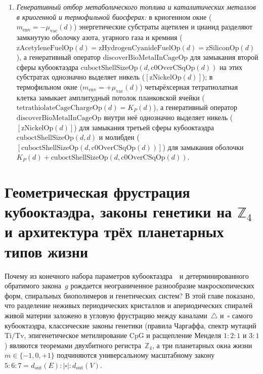 \begin{theorem}
\begin{enumerate}[label=\textbf{(\roman*)},leftmargin=*]
\begin{enumerate}[label=\textbf{(\alph*)},leftmargin=*,noitemsep]
  \item \emph{Генеративный отбор метаболического топлива и каталитических металлов в криогенной и термофильной биосферах:} в криогенном окне ($m_{\mathrm{env}}=-\mu_{\mathrm{vac}}(d)$) энергетические субстраты ацетилен и цианид разделяют замкнутую оболочку азота, угарного газа и кремния ($\mathrm{zAcetyleneFuelOp}(d) = \mathrm{zHydrogenCyanideFuelOp}(d) = \mathrm{zSiliconOp}(d)$), а генеративный оператор $\mathrm{discoverBioMetalInCageOp}$ для замыкания второй сферы кубооктаэдра $\mathrm{cuboctShellSizeOp}(d,\mathrm{c0OverCSqOp}(d))$ на этих субстратах однозначно выделяет никель ($[\mathrm{zNickelOp}(d)]$); в термофильном окне ($m_{\mathrm{env}}=+\mu_{\mathrm{vac}}(d)$) четырёхсерная тетратиолатная клетка замыкает амплитудный потолок планковской ячейки ($\mathrm{tetrathiolateCageChargeOp}(d) = K_P(d)$), а генеративный оператор $\mathrm{discoverBioMetalInCageOp}$ внутри неё однозначно выделяет никель ($[\mathrm{zNickelOp}(d)]$) для замыкания третьей сферы кубооктаэдра $\mathrm{cuboctShellSizeOp}(d,d)$ и молибден ($[\mathrm{cuboctShellSizeOp}(d,\mathrm{c0OverCSqOp}(d))]$) для замыкания оболочки $K_P(d) + \mathrm{cuboctShellSizeOp}(d,\mathrm{c0OverCSqOp}(d))$.
  \end{enumerate}
\end{enumerate}
\end{theorem}

\chapter{Геометрическая фрустрация кубооктаэдра, законы генетики на \texorpdfstring{$\mathbb{Z}_4$}{Z\_4} и архитектура трёх планетарных типов жизни}
\label{ch:bio-frustration-genetics-three-life-types}

Почему из конечного набора параметров кубооктаэдра~\latGCKshort\ и детерминированного обратимого закона~$g$ рождается неограниченное разнообразие макроскопических форм, спиральных биополимеров и генетических систем?
В этой главе показано, что разделение неживых периодических кристаллов и апериодических спиралей живой материи заложено в угловую фрустрацию между каналами~$\triangle$ и~$\square$ самого кубооктаэдра, классические законы генетики (правила Чаргаффа, спектр мутаций $\mathrm{Ti}/\mathrm{Tv}$, эпигенетическое метилирование $\mathrm{CpG}$ и расщепление Менделя $1:2:1$ и $3:1$) являются теоремами двухбитного регистра~$\mathbb{Z}_4$, а три планетарных окна жизни $m\in\{-1,0,+1\}$ подчиняются универсальному масштабному закону $5:6:7 = d_{\mathrm{out}}(E) : |\square| : d_{\mathrm{out}}(V)$.

